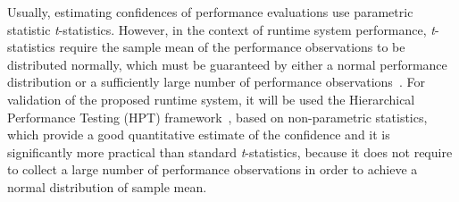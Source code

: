 Usually, estimating confidences of performance evaluations use parametric statistic \textit{t}-statistics. However, in the context of runtime system performance, \textit{t}-statistics require the sample mean of the performance observations to be distributed normally, which must be guaranteed by either a normal performance distribution or a sufficiently large number of performance observations~\cite{sitthi2006}. For validation of the proposed runtime system, it will be used the Hierarchical Performance Testing (HPT) framework~\cite{chen2015}, based on non-parametric statistics, which provide a good quantitative estimate of the confidence and it is significantly more practical than standard \textit{t}-statistics, because it does not require to collect a large number of performance observations in order to achieve a normal distribution of sample mean. 
